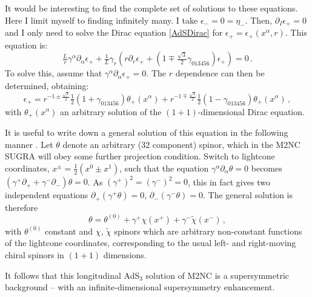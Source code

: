 \documentclass[11pt]{article}
\newcommand{\be}{\begin{equation}}
\newcommand{\ee}{\end{equation}}
\numberwithin{equation}{section}
\begin{document}
{{It would be interesting to find the complete set of solutions to these equations.
Here I limit myself to finding infinitely many. 
I take $\epsilon_- = 0 = \eta_-$.
Then, $\partial_I \epsilon_+ = 0$ and I only need to solve the Dirac equation \eqref{AdSDirac} for $\epsilon_+ = \epsilon_+(x^\alpha,r)$.
This equation is: 
\be
\tfrac{L}{r} \gamma^\alpha \partial_\alpha \epsilon_+ 
+ \tfrac{1}{L} \gamma_r \left( r \partial_r \epsilon_+ + ( 1 \mp \tfrac{\sqrt{3}}{2}  \gamma_{01 3456} )\epsilon_+ \right) 
= 0 \,.
\ee
To solve this, assume that $\gamma^\alpha \partial_\alpha \epsilon_+=0$.
The $r$ dependence can then be determined, obtaining: 
\be
\epsilon_+ = r^{ - 1 \pm \tfrac{\sqrt{3}}{2} } \tfrac{1}{2} ( 1 + \gamma_{01 3456} ) \theta_+(x^\alpha)  
+ r^{ - 1 \mp  \tfrac{\sqrt{3}}{2} } \tfrac{1}{2} ( 1 - \gamma_{01 3456} ) \theta_+(x^\alpha)  \,,
\ee
with $\theta_+(x^\alpha)$ an arbitrary solution of the $(1+1)$-dimensional Dirac equation.

It is useful to write down a general solution of this equation in the following manner \cite{Blair:2020gng}.
Let $\theta$ denote an arbitrary (32 component) spinor, which in the M2NC SUGRA will obey some further projection condition. 
Switch to lightcone coordinates, $x^\pm = \tfrac12 (x^0\pm x^1)$, such that the equation $\gamma^\alpha \partial_\alpha \theta = 0$ becomes $(\gamma^+ \partial_+ + \gamma^- \partial_- ) \theta = 0$.
As $(\gamma^+)^2 = (\gamma^-)^2 = 0$, this in fact gives two independent equations $\partial_+ ( \gamma^+ \theta) = 0$, $\partial_- ( \gamma^- \theta) = 0$.
The general solution is therefore
\be
\theta = \theta^{(0)} + \gamma^+ \chi(x^+) + \gamma^- \tilde \chi(x^-)\,,
\label{thetasolnlc}
\ee
with $\theta^{(0)}$ constant and $\chi$, $\tilde \chi$ spinors which are arbitrary non-constant functions of the lightcone coordinates, corresponding to the usual left- and right-moving chiral spinors in $(1+1)$ dimensions.

It follows that this longitudinal AdS${}_3$ solution of M2NC is a supersymmetric background -- with an infinite-dimensional supersymmetry enhancement.

}}
\end{document}
